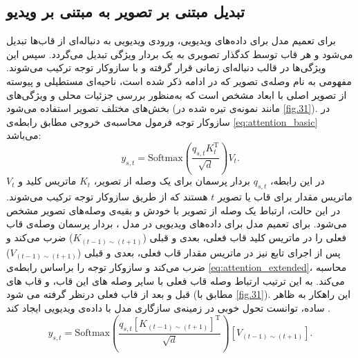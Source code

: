 \subsection{تبدیل  مبتنی بر تصویر به  مبتنی بر ویدیو}
برای تعمیم مدل  برای داده‌های ویدیویی، ورودی ویدیویی به دنباله‌ای از قاب‌‌ها تبدیل می‌شود و هر قاب توسط کدگذار تصویری  به یک بردار ویژگی تبدیل می‌گردد. سپس این ویژگی‌ها در قالب دنباله‌ای زمانی قرار گرفته و با سازوکار توجه ترکیب می‌شوند. مفهومی به نام وصله‌ی تصویر که در ادامه ذکر شده است، ناحیه‌ای مستطیلی و پیوسته از تصویر اصلی با ابعاد مشخص است که به‌منظور بررسی جزئیات محلی و ویژگی‌های بخش‌های مختلف تصویر استفاده می‌شود (مانند نمونه‌ی تیره شده در \cref{fig.31}). در سازوکار توجه فرمول محاسبه‌ی خروجی مطابق رابطه‌ی \eqref{eq:attention_basic} می‌باشد:
\begin{equation}\label{eq:attention_basic}
	y_{s,t} = \mathrm{Softmax}\left( \frac{q_{s,t} K_{t}^{\mathrm{T}}}{\sqrt{d}} \right) V_{t}.
\end{equation}
در این رابطه، $q_{s,t}$ بردار پرسمان برای یک وصله از تصویر، $K_t$ ماتریس کلید و $V_t$ ماتریس مقدار برای قاب یا تصویر $t$ هستند که از طریق سازوکار توجه ترکیب می‌شوند. در این حالت، ارتباط یک وصله از تصویر با خودش و بقیه‌ی وصله‌های تصویر مشخص می‌شود. برای تعمیم مدل برای داده‌های ویدیویی در مدل ، بردار پرسمان وصله‌ی قاب فعلی را در ماتریس کلید قاب فعلی، بعدی و قبلی ($K_{(t-1)\sim(t+1)}$) ضرب می‌کند و پس از اجرای تابع  نیز در ماتریس مقدار قاب فعلی، بعدی و قبلی ($V_{(t-1)\sim(t+1)}$) ضرب می‌کند و سازوکار توجه را براساس رابطه‌ی \eqref{eq:attention_extended}، محاسبه می‌کند. به این ترتیب ارتباط وصله قاب فعلی با سایر وصله های این قاب،  و قاب های قبل و بعد از قاب فعلی درنظر گرفته می شود (مطابق با \cref{fig.31}). این راهکار به ظاهر ساده، توانست تحول خوبی در زمینه‌ی سازگاری مدل  با داده‌ی ویدیویی ایجاد کند \cite{open-vclip}.
\begin{equation}\label{eq:attention_extended}
	y_{s,t} = \mathrm{Softmax}\left( 
	\frac{q_{s,t} \left[ K_{(t-1)\sim(t+1)} \right]^{\mathrm{T}}}{\sqrt{d}} 
	\right) 
	\left[ V_{(t-1)\sim(t+1)} \right].
\end{equation}

